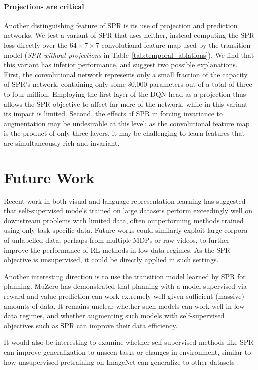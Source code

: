 \paragraph{Projections are critical}
Another distinguishing feature of SPR is its use of projection and prediction networks.  We test a variant of SPR that uses neither, instead computing the SPR loss directly over the $64\times 7 \times 7$ convolutional feature map used by the transition model (\textit{SPR without projections} in Table~\ref{tab:temporal_ablations}).  We find that this variant has inferior performance, and suggest two possible explanations.  First, the convolutional network represents only a small fraction of the capacity of SPR's network, containing only some 80,000 parameters out of a total of three to four million.  Employing the first layer of the DQN head as a projection thus allows the SPR objective to affect far more of the network, while in this variant its impact is limited.  Second, the effects of SPR in forcing invariance to augmentation may be undesirable at this level; as the convolutional feature map is the product of only three layers, it may be challenging to learn features that are simultaneously rich and invariant.

\section{Future Work}
Recent work in both visual \citep{simCLRv2} and language representation learning \citep{gpt3} has suggested that self-supervised models trained on large datasets perform exceedingly well on downstream problems with limited data, often outperforming methods trained using only task-specific data. Future works could similarly exploit large corpora of unlabelled data, perhaps from multiple MDPs or raw videos, to further improve the performance of RL methods in low-data regimes.  As the SPR objective is unsupervised, it could be directly applied in such settings.

Another interesting direction is to use the transition model learned by SPR for planning. MuZero \citep{muzero} has demonstrated that planning with a model supervised via reward and value prediction can work extremely well given sufficient (massive) amounts of data. It remains unclear whether such models can work well in low-data regimes, and whether augmenting such models with self-supervised objectives such as SPR can improve their data efficiency.

It would also be interesting to examine whether self-supervised methods like SPR can improve generalization to unseen tasks or changes in environment, similar to how unsupervised pretraining on ImageNet can generalize to other datasets \citep{moco, BYOL}.

